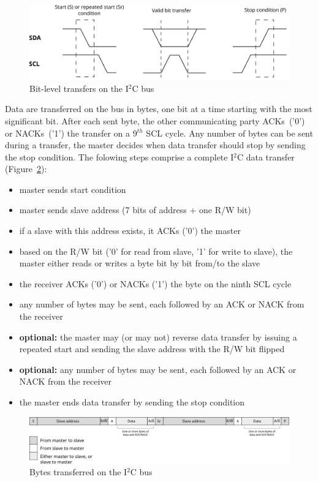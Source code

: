 \documentclass[a4paper,11pt]{article}
\begin{document}
\begin{figure}[h]
  \centerline{\includegraphics[width=.9\textwidth]{fig/i2c-bitlevel}}
  \caption{Bit-level transfers on the I$^2$C bus}
  \label{fig:i2c-bitlevel}
\end{figure}

Data are transferred on the bus in bytes, one bit at a time starting with the most significant bit.
After each sent byte, the other communicating party ACKs~('0') or NACKs~('1') the transfer on a
9$^{th}$ SCL cycle. Any number of bytes can be sent during a transfer, the master decides when data
transfer should stop by sending the stop condition. The folowing steps comprise a complete I$^2$C
data transfer (Figure~\ref{fig:i2c-transf}):
\begin{itemize}
  \item master sends start condition
  \item master sends slave address (7 bits of address + one R/W bit)
  \item if a slave with this address exists, it ACKs ('0') the master
  \item based on the R/W bit ('0' for read from  slave, '1' for write to slave), the master either
  reads or writes a byte bit by bit from/to the slave
  \item the receiver ACKs ('0') or NACKs ('1') the byte on the ninth SCL cycle
  \item any number of bytes may be sent, each followed by an ACK or NACK from the receiver
  \item \textbf{optional:} the master may (or may not) reverse data transfer by issuing a repeated start and sending the
  slave address with the R/W bit flipped
  \item \textbf{optional:} any number of bytes may be sent, each followed by an ACK or NACK from the receiver
  \item the master ends data transfer by sending the stop condition
\end{itemize}

\begin{figure}[h]
  \centerline{\includegraphics[width=\textwidth]{fig/i2c-transf}}
  \caption{Bytes transferred on the I$^2$C bus}
  \label{fig:i2c-transf}
\end{figure}
\end{document}
